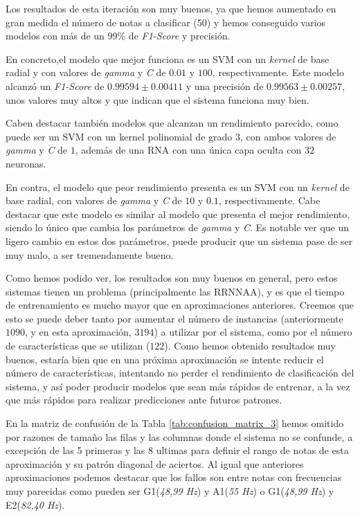 \documentclass[12pt]{article}
\begin{document}
Los resultados de esta iteración son muy buenos, ya que hemos aumentado en gran medida el número de notas
a clasificar (50) y hemos conseguido varios modelos con más de un 99\% de \textit{F1-Score} y precisión. 

\bigskip
En concreto,el modelo que mejor funciona es un SVM con un \textit{kernel} de base radial y con valores de \textit{gamma} y
\textit{C} de $0.01$ y $100$, respectivamente. Este modelo alcanzó un \textit{F1-Score} de 
$0.99594 \pm 0.00411$ y una precisión de $0.99563 \pm 0.00257$, unos valores muy altos y que indican
que el sistema funciona muy bien. 

\bigskip
Caben destacar también modelos que alcanzan un rendimiento parecido,
como puede ser un SVM con un kernel polinomial de grado $3$, con ambos valores de \textit{gamma} y \textit{C} de $1$,
además de una RNA con una única capa oculta con $32$ neuronas.

\bigskip
En contra, el modelo que peor rendimiento presenta es un SVM con un \textit{kernel} de base radial,
con valores de \textit{gamma} y \textit{C} de $10$ y $0.1$, respectivamente. Cabe destacar que este modelo
es similar al modelo que presenta el mejor rendimiento, siendo lo único que cambia los parámetros de
\textit{gamma} y \textit{C}. Es notable ver que un ligero cambio en estos dos parámetros, puede 
producir que un sistema pase de ser muy malo, a ser tremendamente bueno.

\bigskip
Como hemos podido ver, los resultados son muy buenos en general, pero estos sistemas tienen un problema (principalmente las RRNNAA),
y es que el tiempo de entrenamiento es mucho mayor que en aproximaciones anteriores. Creemos que esto se puede deber tanto por
aumentar el número de instancias (anteriormente $1090$, y en esta aproximación, $3194$) a utilizar por el sistema,
como por el número de características que se utilizan ($122$). Como hemos obtenido resultados muy buenos, estaría bien que
en una próxima aproximación se intente reducir el número de características, intentando no perder el rendimiento
de clasificación del sistema, y así poder producir modelos que sean más rápidos de entrenar, a la vez que más rápidos
para realizar predicciones ante futuros patrones.

\bigskip
En la matriz de confusión de la Tabla \ref{tab:confusion_matrix_3} hemos omitido por razones de tamaño las filas y las columnas donde 
el sistema no se confunde, a excepción de las 5 primeras y las 8 ultimas para definir el rango de notas de esta aproximación y su 
patrón diagonal de aciertos. Al igual que anteriores aproximaciones podemos destacar que los fallos son entre notas con frecuencias muy
parecidas como pueden ser G1(\textit{48,99 Hz}) y A1(\textit{55 Hz}) o G1(\textit{48,99 Hz}) y E2(\textit{82,40 Hz}).
\end{document}
